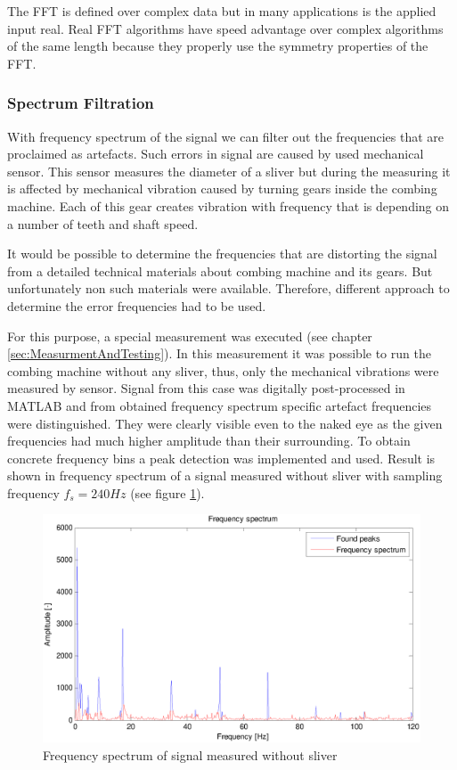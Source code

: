 \documentclass[twoside]{ctuthesis}
\theoremstyle{plain}
\theoremstyle{definition}
\theoremstyle{note}
\begin{document}
The FFT is defined over complex data but in many applications is the applied input real. Real FFT algorithms have speed advantage over complex algorithms of the same length because they properly use the symmetry properties of the FFT.

\subsubsection{Spectrum Filtration}
\label{sec:spectrumFiltration}
With frequency spectrum of the signal we can filter out the frequencies that are proclaimed as artefacts. Such errors in signal are caused by used mechanical sensor. This sensor measures the diameter of a sliver but during the measuring it is affected by mechanical vibration caused by turning gears inside the combing machine. Each of this gear creates vibration with frequency that is depending on a number of teeth and shaft speed. 

It would be possible to determine the frequencies that are distorting the signal from a detailed technical materials about combing machine and its gears. But unfortunately non such materials were available. Therefore, different approach to determine the error frequencies had to be used. 

For this purpose, a special measurement was executed (see chapter \ref{sec:MeasurmentAndTesting}). In this measurement it was possible to run the combing machine without any sliver, thus, only the mechanical vibrations were measured by sensor. Signal from this case was digitally post-processed in MATLAB and from obtained frequency spectrum specific artefact frequencies were distinguished. They were clearly visible even to the naked eye as the given frequencies had much higher amplitude than their surrounding. To obtain concrete frequency bins a peak detection was implemented and used. Result is shown in frequency spectrum of a signal measured without sliver with sampling frequency $f_s=240Hz$ (see figure \ref{fig:withoutMat_foundPeaks}).

\begin{figure}[h]
	\centering
	\includegraphics[width=1.0\textwidth]{withoutMat_foundPeaks_half.eps}
	\caption{Frequency spectrum of signal measured without sliver}
	\label{fig:withoutMat_foundPeaks}
\end{figure}
\end{document}
